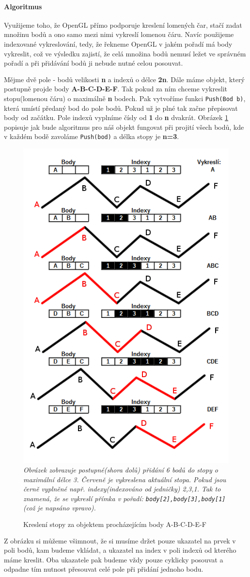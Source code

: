 \paragraph{Algoritmus}Využijeme toho, že OpenGL přímo podporuje kreslení lomených čar, stačí zadat množinu bodů a ono samo mezi nimi vykreslí lomenou čáru. Navíc použijeme indexované vykreslování, tedy, že řekneme OpenGL v jakém pořadí má body vykreslit, což ve výsledku zajistí, že celá množina bodů nemusí ležet ve správném pořadí a při přidávání bodů ji nebude nutné celou posouvat.


Mějme dvě pole - bodů velikosti \textbf{n} a indexů o délce \textbf{2n}.
Dále máme objekt, který postupně projde body \textbf{A-B-C-D-E-F}. Tak pokud za ním chceme vykreslit stopu(lomenou čáru) o maximálně \textbf{n} bodech. Pak vytvoříme funkci \texttt{Push(Bod b)}, která umístí předaný bod do pole bodů. Pokud už je plné tak začne přepisovat body od začátku. Pole indexů vyplníme čísly od \textbf{1} do \textbf{n} dvakrát. Obrázek \ref{fig:lineTrail} popisuje jak bude algoritmus pro náš objekt fungovat při projití všech bodů, kde v každém bodě zavoláme \texttt{Push(bod)} a délka stopy je \textbf{n=3}.

\begin{figure}
	\caption{Kreslení stopy za objektem procházejícím body A-B-C-D-E-F}
	\label{fig:lineTrail} 
	\centering
	\includegraphics[width=0.5\linewidth]{Figs/LineTrail}\\
	\textit{Obrázek zobrazuje postupné(shora dolů) přidání 6 bodů do stopy o maximální délce 3. Červeně je vykreslena aktuální stopa. Pokud jsou černě vyplněné např. indexy(indexováno od jedničky) 2,3,1. Tak to znamená, že se vykreslí přímka v pořadí: \lstinline|body[2],body[3],body[1]|(což je napsáno vpravo).}
\end{figure}
\FloatBarrier
Z obrázku si můžeme všimnout, že si musíme držet pouze ukazatel na prvek v poli bodů, kam budeme vkládat, a ukazatel na index v poli indexů od kterého máme kreslit. Oba ukazatele pak budeme vždy pouze cyklicky posouvat a odpadne tím nutnost přesouvat celé pole při přidání jednoho bodu.
\\

